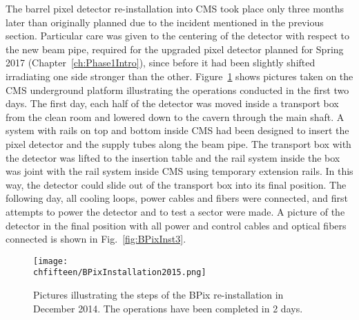 The barrel pixel detector re-installation into CMS took place only three months later than originally planned due to the incident mentioned in the previous section. 
Particular care was given to the centering of the detector with respect to the new beam pipe, required for the upgraded pixel detector planned for Spring 2017 (Chapter~\ref{ch:Phase1Intro}),
since before it had been slightly shifted irradiating one side stronger than the other.
Figure~\ref{fig:BPixInst2} shows pictures taken on the CMS underground platform illustrating the operations conducted in the first two days.
The first day, each half of the detector was moved inside a transport box from the clean room and lowered down to the cavern through the main shaft.
A system with rails on top and bottom inside CMS had been designed to insert the pixel detector and the supply tubes along the beam pipe.
The transport box with the detector was lifted to the insertion table and the rail system inside the box was joint with the rail system inside CMS using temporary extension rails.
In this way, the detector could slide out of the transport box into its final position.
The following day, all cooling loops, power cables and fibers were connected, and first attempts to power the detector and to test a sector were made.
A picture of the detector in the final position with all power and control cables and optical fibers connected is shown in Fig.~\ref{fig:BPixInst3}.

\begin{figure}[!htb]
 \begin{center}
 \texttt{[image: \\chfifteen/BPixInstallation2015.png]}
 \end{center}
 \caption{Pictures illustrating the steps of the BPix re-installation in December 2014. The operations have been completed in 2 days.}
 \label{fig:BPixInst2}
\end{figure}

